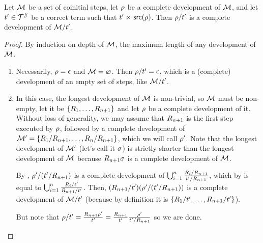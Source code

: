 \begin{lemma}
Let $\mathcal{M}$ be a set of coinitial steps,
let $\rho$ be a complete development of $\mathcal{M}$,
and let $t' \in \mathcal{T}^{\mathtt{\#}}$ be a correct term such that $t' \mathrel{\ltimes} \mathsf{src}(\rho)$.
Then $\rho/t'$ is a complete development of $\mathcal{M}/t'$.
\end{lemma}
\begin{proof}
By induction on depth of $\mathcal{M}$, \ie the maximum length of any development of $\mathcal{M}$.
\begin{enumerate}
  \item {} Necessarily, $\rho = \epsilon$ and $\mathcal{M} = \varnothing$.
    Then $\rho / t' = \epsilon$, which is a (complete) development of an empty set of steps,
    like $\mathcal{M} / t'$.
  \item {} In this case, the longest development of $\mathcal{M}$ is non-trivial, so
    $\mathcal{M}$ must be non-empty, let it be $\{R_1, \hdots, R_{n+1}\}$
    and let $\rho$ be a complete development of it.
    Without loss of generality, we may assume that $R_{n+1}$ is the first step executed by $\rho$,
    followed by a complete development of
    $\mathcal{M}' = \{R_1 / R_{n+1}, \hdots, R_n / R_{n+1}\}$, which we will call $\rho'$.
    Note that the longest development of $\mathcal{M}'$ (let's call it $\sigma$) is strictly shorter
    than the longest development of $\mathcal{M}$ because $R_{n+1} \sigma$
    is a complete development of $\mathcal{M}$.

    By \ih, $\rho' / (t' / R_{n+1})$ is a complete development of
    $\bigcup_{i=1}^n \frac{R_i / R_{n+1}}{t' / R_{n+1}}$,
    which by  is equal to
    $\bigcup_{i=1}^n \frac{R_i / t'}{R_{n+1} / t'}$.
    Then, $(R_{n+1} / t') (\rho' / (t' / R_{n+1}))$ is a complete development of
    $\mathcal{M} / t'$ (because by definition it is $\{R_1 / t', \hdots, R_{n+1} / t'\}$).

    But note that
    $\rho / t' =
        \frac{R_{n+1}\rho'}{t'} =
        \frac{R_{n+1}}{t'} \frac{\rho'}{t' / R_{n+1}}$ so we are done.
\end{enumerate}
\end{proof}
\bigskip


